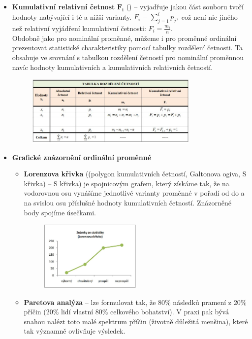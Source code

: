 \begin{itemize}
	\item \textbf{Kumulativní relativní četnost} $\mathbf{F_i}$ () -- vyjadřuje jakou část souboru tvoří hodnoty nabývající i-té a nižší varianty. $F_i = \sum\limits_{j=1}^i p_j,$ což není nic jiného než relativní vyjádření kumulativní četnosti: $F_i = \frac{m_i}{n}$. \\ 
	Obdobně jako pro nominální proměnné, můžeme i pro proměnné ordinální prezentovat statistické charakteristiky pomocí tabulky rozdělení četnosti. Ta obsahuje ve srovnání s tabulkou rozdělení četností pro nominální proměnnou navíc hodnoty kumulativních a kumulativních relativních četností.\\
				\begin{figure}[H]
				\centering
				\includegraphics[width=0.8\textwidth]{assets/13_tabl_cetnost_ord}
				\end{figure}
	\item \textbf{Grafické znázornění ordinální proměnné}
	\begin{itemize}
		\item \textbf{Lorenzova křivka} ((polygon kumulativních četností, Galtonova ogiva, S křivka) -- S křivka) je spojnicovým grafem, který získáme tak, že na vodorovnou osu vynášíme jednotlivé varianty proměnné v pořadí od  do  a na svislou osu příslušné hodnoty kumulativních četností. Znázorněné body spojíme úsečkami.
				\begin{figure}[H]
				\centering
				\includegraphics[width=0.5\textwidth]{assets/13_lorenzo}
				\end{figure}
		\item \textbf{Paretova analýza} -- lze formulovat tak, že 80\% následků pramení z 20\% příčin (20\% lidí vlastní 80\% celkového bohatství). V praxi pak bývá snahou nalézt toto malé spektrum příčin (životně důležitá menšina), které tak významně ovlivňuje výsledek.
	\end{itemize}
\end{itemize}
